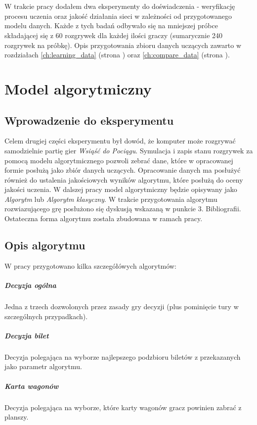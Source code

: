 \documentclass[12pt, oneside]{report}
\begin{document}
\\ \\ 
W trakcie pracy dodałem dwa eksperymenty do doświadczenia - weryfikację procesu uczenia oraz jakość działania sieci w zależności od przygotowanego modelu danych. Każde z tych badań odbywało się na mniejszej próbce składającej się z 60 rozgrywek dla każdej ilości graczy (sumarycznie 240 rozgrywek na próbkę). Opis przygotowania zbioru danych uczących zawarto w rozdziałach \ref{ch:learning_data} (strona \pageref{ch:learning_data}) oraz \ref{ch:compare_data} (strona \pageref{ch:compare_data}).

\chapter{Model algorytmiczny}
\label{model:algo}
\section{Wprowadzenie do eksperymentu}
Celem drugiej części eksperymentu był dowód, że komputer może rozgrywać samodzielnie partię gier \textit{Wsiąść do Pociągu}. Symulacja i zapis stanu rozgrywek za pomocą modelu algorytmicznego pozwoli zebrać dane, które w opracowanej formie posłużą jako zbiór danych uczących. Opracowanie danych ma posłużyć również do ustalenia jakościowych wyników algorytmu, które posłużą do oceny jakości uczenia. W dalszej pracy model algorytmiczny będzie opisywany jako \textit{Algorytm} lub \textit{Algorytm klasyczny}. W trakcie przygotowania algorytmu rozwiazującego grę posłużono się dyskusją wskazaną w punkcie 3. Bibliografii. Ostateczna forma algorytmu została zbudowana w ramach pracy.
\section{Opis algorytmu}
W pracy przygotowano kilka szczegółówych algorytmów:
\paragraph{Decyzja ogólna} Jedna z trzech dozwolonych przez zasady gry decyzji (plus pominięcie tury w szczególnych przypadkach).
\paragraph{Decyzja bilet} Decyzja polegająca na wyborze najlepszego podzbioru biletów z przekazanych jako parametr algorytmu.
\paragraph{Karta wagonów} Decyzja polegająca na wyborze, które karty wagonów gracz powinien zabrać z planszy.
\end{document}
